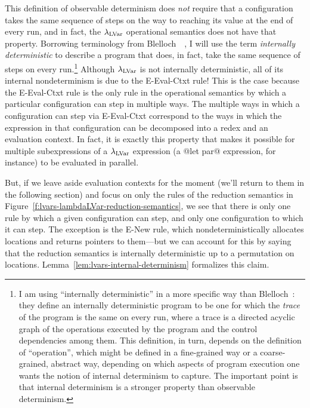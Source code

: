 This definition of observable determinism does \emph{not} require that
a configuration takes the same sequence of steps on the way to
reaching its value at the end of every run, and in fact, the
$\lambda_{\textrm{LVar}}$ operational semantics does not have that property.
Borrowing terminology from
Blelloch~\etal~\cite{blelloch-internally-deterministic}, I will use
the term \emph{internally deterministic} to describe a program that
does, in fact, take the same sequence of steps on every
run.\footnote{I am using ``internally deterministic'' in a more
  specific way than Blelloch~\etal: they define an internally
  deterministic program to be one for which the \emph{trace} of the
  program is the same on every run, where a trace is a directed
  acyclic graph of the operations executed by the program and the
  control dependencies among them.  This definition, in turn, depends
  on the definition of ``operation'', which might be defined in a
  fine-grained way or a coarse-grained, abstract way, depending on
  which aspects of program execution one wants the notion of internal
  determinism to capture.  The important point is that internal
  determinism is a stronger property than observable determinism.}
Although $\lambda_{\textrm{LVar}}$ is not internally deterministic, all of its
internal nondeterminism is due to the {\sc E-Eval-Ctxt} rule!  This is
the case because the {\sc E-Eval-Ctxt} rule is the only rule in the
operational semantics by which a particular configuration can step in
multiple ways.  The multiple ways in which a configuration can step
via {\sc E-Eval-Ctxt} correspond to the ways in which the expression
in that configuration can be decomposed into a redex and an evaluation
context.  In fact, it is exactly this property that makes it possible
for multiple subexpressions of a $\lambda_{\textrm{LVar}}$ expression (a @let par@
expression, for instance) to be evaluated in parallel.

But, if we leave aside evaluation contexts for the moment (we'll
return to them in the following section) and focus on only the rules
of the reduction semantics in
Figure~\ref{f:lvars-lambdaLVar-reduction-semantics}, we see that there
is only one rule by which a given configuration can step, and only one
configuration to which it can step.  The exception is the {\sc E-New}
rule, which nondeterministically allocates locations and returns
pointers to them---but we can account for this by saying that the
reduction semantics is internally deterministic up to a permutation on
locations.  Lemma~\ref{lem:lvars-internal-determinism} formalizes this
claim.

